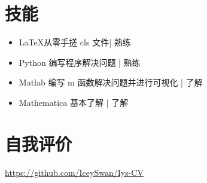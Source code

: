 \documentclass{HENU-CV}
\begin{document}
\section{技能}

\begin{itemize}
    \item \LaTeX \hfill 从零手搓 cls 文件| 熟练
    \item Python \hfill 编写程序解决问题 | 熟练
    \item Matlab \hfill 编写 m 函数解决问题并进行可视化 | 了解
    \item Mathematica \hfill 基本了解 | 了解
\end{itemize}

\section{自我评价}
\href{https://github.com/IceySwan/Iys-CV}{https://github.com/IceySwan/Iys-CV}
\end{document}
